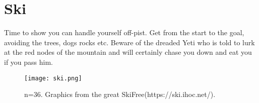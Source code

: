 \documentclass{article}
\begin{document}
\section{Ski}
Time to show you can handle yourself off-pist. Get from the start to the goal, avoiding the trees, dogs rocks etc.
Beware of the dreaded Yeti who is told to lurk at the red nodes of the mountain and will certainly chase you down and eat you if you pass him.

\begin{figure}[h]
  \centering
\texttt{[image: ski.png]}  
  \caption{n=36. Graphics from the great SkiFree(https://ski.ihoc.net/).}
\end{figure}
\end{document}

